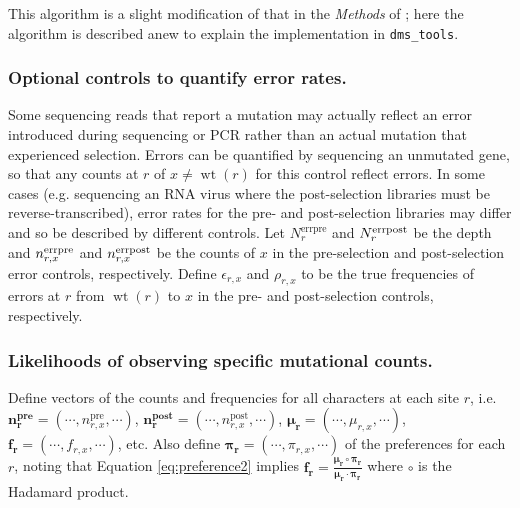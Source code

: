 \documentclass[twocolumn]{bmcart}%
\begin{document}
This algorithm is a slight modification of that in the \textsl{Methods} of \cite{bloom2014experimentally}; here the algorithm is described anew to explain the implementation in \texttt{dms\_tools}. 

\subsubsection*{Optional controls to quantify error rates.}
Some sequencing reads that report a mutation may actually reflect an error introduced during sequencing or PCR rather than an actual mutation that experienced selection. Errors can be quantified by sequencing an unmutated gene, so that any counts at $r$ of $x \ne \operatorname{wt}\left(r\right)$ for this control reflect errors. In some cases (e.g. sequencing an RNA virus where the post-selection libraries must be reverse-transcribed), error rates for the pre- and post-selection libraries may differ and so be described by different controls. Let $N_r^{\textrm{errpre}}$ and $N_r^{\rm{errpost}}$ be the depth and $n_{r,x}^{\rm{errpre}}$ and $n_{r,x}^{\rm{errpost}}$ be the counts of $x$ in the pre-selection and post-selection error controls, respectively. Define $\epsilon_{r,x}$ and $\rho_{r,x}$ to be the true frequencies of errors at $r$ from $\operatorname{wt}\left(r\right)$ to $x$ in the pre- and post-selection controls, respectively. 

\subsubsection*{Likelihoods of observing specific mutational counts.}
Define vectors of the counts and frequencies for all characters at each site $r$, i.e. $\mathbf{n_r^{\textbf{pre}}}= \left(\cdots, n_{r,x}^{\textrm{pre}}, \cdots\right)$, $\mathbf{n_r^{\textbf{post}}}= \left(\cdots, n_{r,x}^{\textrm{post}}, \cdots\right)$, $\boldsymbol{\mathbf{\mu_r}} = \left(\cdots, \mu_{r,x}, \cdots\right)$, $\boldsymbol{\mathbf{f_r}} = \left(\cdots, f_{r,x}, \cdots\right)$, etc. Also define $\boldsymbol{\mathbf{\pi_r}}= \left(\cdots, \pi_{r,x}, \cdots\right)$ of the preferences for each $r$, noting that Equation \ref{eq:preference2} implies $\boldsymbol{\mathbf{f_r}} = \frac{\boldsymbol{\mathbf{\mu_r}}\circ\boldsymbol{\mathbf{\pi_r}}}{\boldsymbol{\mathbf{\mu_r}}\cdot \boldsymbol{\mathbf{\pi_r}}}$ where $\circ$ is the Hadamard product.
\end{document}
